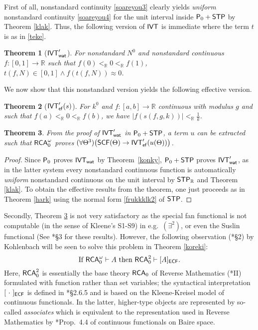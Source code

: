 \documentclass[reqno]{amsart}
\newtheorem{thm}{Theorem}
\newcommand\be{\begin{equation}}
\newcommand\ee{\end{equation}}
\def\STP{\textup{\textsf{STP}}}
\def\RCA{\textup{\textsf{RCA}}}
\def\RCAo{\textup{\textsf{RCA}}_{0}^{\omega}}
\def\ef{\textup{\textsf{ef}}}
\def\IVT{\textup{IVT}}
\def\IVT{\textup{\textsf{IVT}}}
\def\P{\textup{\textsf{P}}}
\def\R{{\mathbb  R}}
\def\R{{\mathbb{R}}}
\def\di{\rightarrow}
\def\IVT{\textup{\textsf{IVT}}}
\def\ECF{\textup{\textsf{ECF}}}
\def\wat{\textup{\textsf{wat}}}
\def\SCF{\textup{\textsf{SCF}}}
\numberwithin{equation}{section}
\numberwithin{thm}{section}
\begin{document}
First of all, nonstandard continuity \eqref{soareyou3} clearly yields \emph{uniform} nonstandard continuity \eqref{soareyou4} for the unit interval inside $\P_{0}+\STP$ by Theorem \ref{klak}.  %
Thus, the following version of $\IVT$ is immediate where the term $t$ is as in \eqref{teke}.  
\begin{thm}[$\IVT_{\textsf{\wat}}'$]\label{wakko2}
For nonstandard $N^{0}$ and nonstandard continuous $f:[0,1]\di \R$ such that $f(0)<_{\R}0<_{\R}f(1)$, $t(f,N)\in [0,1]\wedge f(t(f, N))\approx 0$.  
\end{thm}
We now show that this nonstandard version yields the following effective version.  
\begin{thm}[$\IVT_{\ef}'(s)$]
For $k^{0}$ and $f:[a,b]\di \R$ continuous with modulus $g$ and such that $f(a)<_{\R}0<_{\R}f(b)$, we have $|f(s(f,g,k))|<_{\R}\frac{1}{k}$.
\end{thm}
\begin{thm}\label{konky2}
From the proof of $\IVT_{\textsf{\wat}}'$ in $\P_{0}+\STP$, a term $u$ can be extracted such that $\RCAo$ proves $(\forall \Theta^{3})\big(\SCF(\Theta)\di \IVT_{\ef}'(u(\Theta))\big)$.
\end{thm}
\begin{proof}
Since $\P_{0}$ proves $\IVT_{\wat}$ by Theorem~\ref{konky}, $\P_{0}+\STP$ proves $\IVT_{\wat}'$, as in the latter system every nonstandard continuous function is automatically \emph{uniform} nonstandard continuous on the unit interval by $\STP_{\R}$ and Theorem \ref{klak}.  
To obtain the effective results from the theorem, one just proceeds as in Theorem \ref{hark} using the normal form \eqref{frukkklk2} of $\STP$.
\end{proof}
Secondly, Theorem \ref{konky2} is not very satisfactory as the special fan functional is not computable (in the sense of Kleene's S1-S9) in e.g.\ $(\exists^{2})$, or even the Suslin functional (See \cite{dagsam}*{\S3} for these results).  
However, the following observation (\cite{kohlenbach2}*{\S2}) by Kohlenbach will be seen to solve this problem in Theorem \ref{koreki}:
\be\label{bergje}
\text{If $\RCAo\vdash A$ then $\RCA_{0}^{2}\vdash[A]_{\ECF}$}.
\ee
Here, $\RCA_{0}^{2}$ is essentially the base theory $\RCA_{0}$ of Reverse Mathematics (\cite{simpson2}*{II}) formulated with function rather than set variables; the syntactical interpretation $[~\cdot~]_{\ECF}$ is defined in \cite{troelstra1}*{\S2.6.5} and is based on the Kleene-Kreisel model of continuous functionals.  In the latter, higher-type objects are represented by so-called \emph{associates} which is equivalent to the representation used in Reverse Mathematics by \cite{kohlenbach4}*{Prop.\ 4.4} of continuous functionals on Baire space.  
\end{document}

